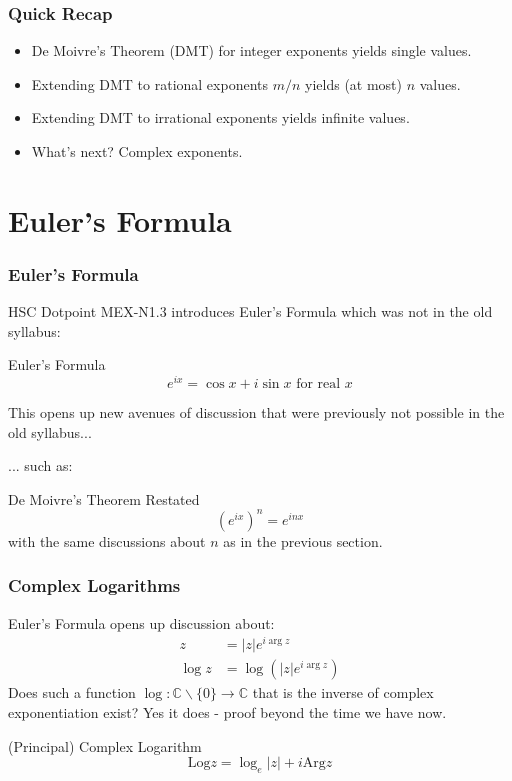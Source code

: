 \documentclass{beamer}
\begin{document}
\begin{frame}
  \frametitle{Quick Recap}
  \begin{itemize}
    \item<1-> De Moivre's Theorem (DMT) for integer exponents yields single values.
    \item<2-> Extending DMT to rational exponents $m/n$ yields (at most) $n$ values.
    \item<3-> Extending DMT to irrational exponents yields infinite values.
    \item<4-> What's next? Complex exponents.
  \end{itemize}
\end{frame}


\section{Euler's Formula}


\begin{frame}
  \frametitle{Euler's Formula}
  HSC Dotpoint MEX-N1.3 introduces Euler's Formula \parencite{syllabus} which was not in the old syllabus:
\begin{block}{Euler's Formula}
  \[ e^{ix} = \cos x + i \sin x \mbox{ for real } x\]
\end{block}
\pause
This opens up new avenues of discussion that were previously not possible in the old syllabus...

\pause
... such as:
\begin{block}{De Moivre's Theorem Restated}
  \[(e^{ix})^n = e^{inx}\]
  with the same discussions about $n$ as in the previous section.
\end{block}
\end{frame}

\begin{frame}
  \frametitle{Complex Logarithms}
  Euler's Formula opens up discussion about:
  \begin{align*}
    z &= |z|e^{i\arg z}\\
    \log z & = \log ( |z| e^{i\arg z} )
  \end{align*}
  \pause
  Does such a function $\log: \mathbb{C}\backslash\{0\} \rightarrow \mathbb{C}$ that is the inverse of complex exponentiation exist? Yes it does - proof beyond the time we have now.
  \pause
  \begin{block}{(Principal) Complex Logarithm \parencite[p.~126]{daners}}
    \[\mbox{Log} z = \log_e |z| + i\mbox{Arg} z\]
  \end{block}
\end{frame}
\end{document}

